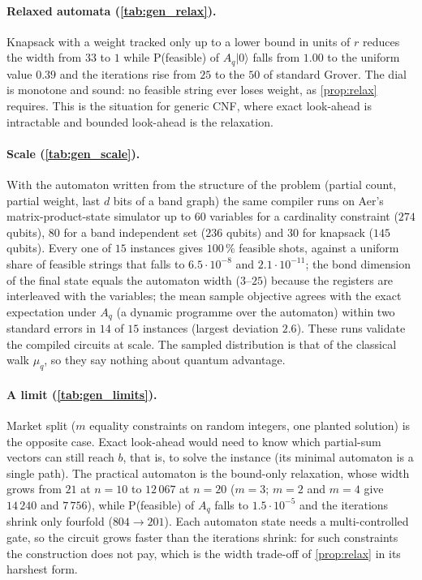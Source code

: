 \paragraph{Relaxed automata (\cref{tab:gen_relax}).} Knapsack with a weight tracked only up to a lower bound in units of $r$ reduces the width from $33$ to $1$ while P(feasible) of $A_q|0\rangle$ falls from $1.00$ to the uniform value $0.39$ and the iterations rise from $25$ to the $50$ of standard Grover. The dial is monotone and sound: no feasible string ever loses weight, as \cref{prop:relax} requires. This is the situation for generic CNF, where exact look-ahead is intractable and bounded look-ahead is the relaxation.



\paragraph{Scale (\cref{tab:gen_scale}).} With the automaton written from the structure of the problem (partial count, partial weight, last $d$ bits of a band graph) the same compiler runs on Aer's matrix-product-state simulator up to $60$ variables for a cardinality constraint ($274$ qubits), $80$ for a band independent set ($236$ qubits) and $30$ for knapsack ($145$ qubits). Every one of $15$ instances gives $100$\,\% feasible shots, against a uniform share of feasible strings that falls to $6.5\cdot10^{-8}$ and $2.1\cdot10^{-11}$; the bond dimension of the final state equals the automaton width ($3$--$25$) because the registers are interleaved with the variables; the mean sample objective agrees with the exact expectation under $A_q$ (a dynamic programme over the automaton) within two standard errors in $14$ of $15$ instances (largest deviation $2.6$). These runs validate the compiled circuits at scale. The sampled distribution is that of the classical walk $\mu_q$, so they say nothing about quantum advantage.

\paragraph{A limit (\cref{tab:gen_limits}).} Market split ($m$ equality constraints on random integers, one planted solution) is the opposite case. Exact look-ahead would need to know which partial-sum vectors can still reach $b$, that is, to solve the instance (its minimal automaton is a single path). The practical automaton is the bound-only relaxation, whose width grows from $21$ at $n=10$ to $12\,067$ at $n=20$ ($m=3$; $m=2$ and $m=4$ give $14\,240$ and $7\,756$), while P(feasible) of $A_q$ falls to $1.5\cdot10^{-5}$ and the iterations shrink only fourfold ($804\to201$). Each automaton state needs a multi-controlled gate, so the circuit grows faster than the iterations shrink: for such constraints the construction does not pay, which is the width trade-off of \cref{prop:relax} in its harshest form.
